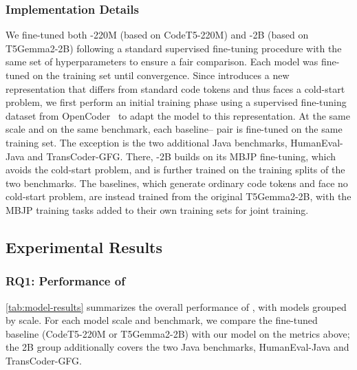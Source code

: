 \subsubsection{Implementation Details}

We fine-tuned both \mainname-220M (based on CodeT5-220M) and \mainname-2B (based on T5Gemma2-2B) following a standard supervised fine-tuning procedure with the same set of hyperparameters to ensure a fair comparison. Each model was fine-tuned on the training set until convergence.
Since \mainname introduces a new representation that differs from standard code tokens and thus faces a cold-start problem, we first perform an initial training phase using a supervised fine-tuning dataset from OpenCoder~\cite{DBLP:journals/corr/abs-2411-04905} to adapt the model to this representation.
At the same scale and on the same benchmark, each baseline--\mainname{} pair is fine-tuned on the same training set. The exception is the two additional Java benchmarks, HumanEval-Java and TransCoder-GFG. There, \mainname-2B builds on its MBJP fine-tuning, which avoids the cold-start problem, and is further trained on the training splits of the two benchmarks. The baselines, which generate ordinary code tokens and face no cold-start problem, are instead trained from the original T5Gemma2-2B, with the MBJP training tasks added to their own training sets for joint training.

\subsection{Experimental Results}

\subsubsection{RQ1: Performance of \mainname}
\autoref{tab:model-results} summarizes the overall performance of \mainname, with models grouped by scale.
For each model scale and benchmark, we compare the fine-tuned baseline (CodeT5-220M or T5Gemma2-2B) with our \mainname{} model on the metrics above; the 2B group additionally covers the two Java benchmarks, HumanEval-Java and TransCoder-GFG.

